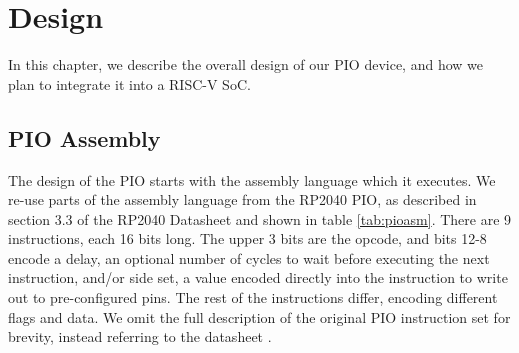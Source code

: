 \chapter{Design}
\label{ch:design}

In this chapter, we describe the overall design of our PIO device, and how we plan to integrate it into a RISC-V SoC.

\section{PIO Assembly}

The design of the PIO starts with the assembly language which it executes. We re-use parts of the assembly language from the RP2040 PIO, as described in section 3.3 of the RP2040 Datasheet and shown in table \ref{tab:pioasm}. There are 9 instructions, each 16 bits long. The upper 3 bits are the opcode, and bits 12-8 encode a delay, an optional number of cycles to wait before executing the next instruction, and/or side set, a value encoded directly into the instruction to write out to pre-configured pins. The rest of the instructions differ, encoding different flags and data. We omit the full description of the original PIO instruction set for brevity, instead referring to the datasheet \cite{rp2040}.

